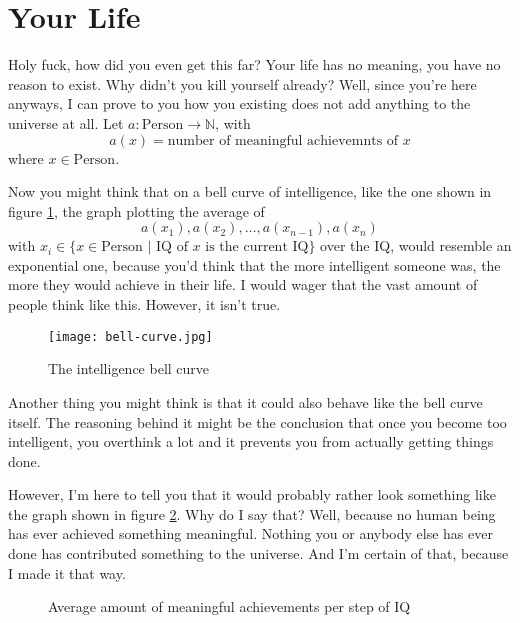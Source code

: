 \section{Your Life}

Holy fuck, how did you even get this far? Your life has no meaning, you have no reason to exist. Why didn't you kill yourself already?
Well, since you're here anyways, I can prove to you how you existing does not add anything to the universe at all.
Let $a : \text{Person} \rightarrow \mathbb{N}$, with 
$$a(x) = \text{number of meaningful achievemnts of } x$$
where $x \in \text{Person}$.

Now you might think that on a bell curve of intelligence, like the one shown in 
figure \ref{fig:bell-curve}, the graph plotting the average of 
$$a(x_1), a(x_2), \dotsc, a(x_{n-1}), a(x_n)$$
with $x_i \in \{x \in \text{Person } | \text{ IQ of } x \text{ is the current IQ}\}$ over the IQ, would resemble an exponential one, because
you'd think that the more intelligent someone was, the more they would achieve in their life. I would wager that the vast amount of people
think like this. However, it isn't true.

\begin{figure}[h]
  \center
  \texttt{[image: bell-curve.jpg]}
  \caption{The intelligence bell curve}
  \label{fig:bell-curve}
\end{figure}

Another thing you might think is that it could also behave like the bell curve itself. The reasoning behind it might be the conclusion that
once you become too intelligent, you overthink a lot and it prevents you from actually getting things done.

\pagebreak

However, I'm here to tell you that it would probably rather look something like the graph shown in figure \ref{fig:graph-achievements}.
Why do I say that? Well, because no human being has ever achieved something meaningful. Nothing you or anybody else has ever done has
contributed something to the universe. And I'm certain of that, because I made it that way.

\begin{figure}[h]
  \center
  \caption{Average amount of meaningful achievements per step of IQ}
  \label{fig:graph-achievements}
\end{figure}